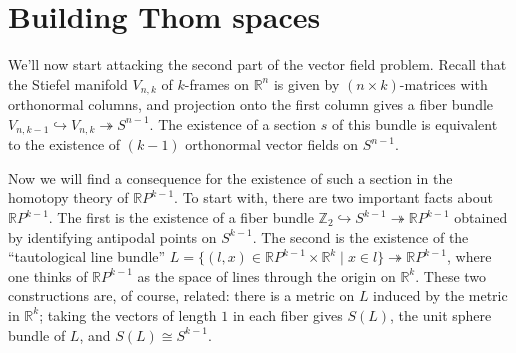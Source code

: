 \documentclass{article}
\providecommand{\OutputBuildingThomSpaces}{3}
\newcommand{\Z}{\mathbb{Z}}
\newcommand{\R}{\mathbb{R}}
\newcommand{\RP}{\R P}
\newcommand{\into}{\hookrightarrow}
\newcommand{\onto}{\twoheadrightarrow}
\theoremstyle{definition}
\begin{document}
\section{Building Thom spaces} %
\label{BuildingThomSpaces}
\ifx\OutputBuildingThomSpaces\undefined\else
We'll now start attacking the second part of the vector field problem.  Recall that the Stiefel manifold $V_{n, k}$ of $k$-frames on $\R^n$ is given by $(n \times k)$-matrices with orthonormal columns, and projection onto the first column gives a fiber bundle $V_{n, k-1} \into V_{n, k} \onto S^{n-1}$.  The existence of a section $s$ of this bundle is equivalent to the existence of $(k-1)$ orthonormal vector fields on $S^{n-1}$.

Now we will find a consequence for the existence of such a section in the homotopy theory of $\RP^{k-1}$.  To start with, there are two important facts about $\RP^{k-1}$.  The first is the existence of a fiber bundle $\Z_2 \into S^{k-1} \onto \RP^{k-1}$ obtained by identifying antipodal points on $S^{k-1}$.  The second is the existence of the ``tautological line bundle'' $L = \{(l, x) \in \RP^{k-1} \times \R^k \mid x \in l\} \onto \RP^{k-1}$, where one thinks of $\RP^{k-1}$ as the space of lines through the origin on $\R^k$.  These two constructions are, of course, related: there is a metric on $L$ induced by the metric in $\R^k$; taking the vectors of length $1$ in each fiber gives $S(L)$, the unit sphere bundle of $L$, and $S(L) \cong S^{k-1}$.
\end{document}
